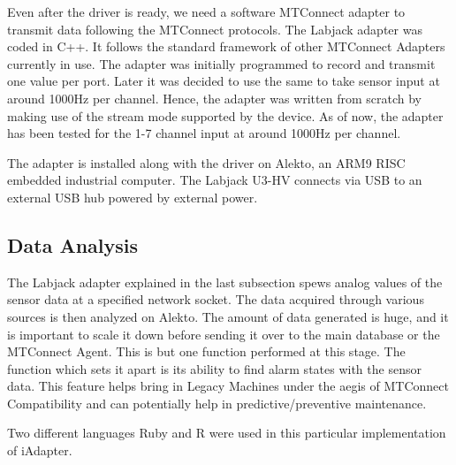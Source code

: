 \documentclass[preprint,authoryear,5p,times,twocolumn]{elsarticle}
\begin{document}
Even after the driver is ready, we need a software MTConnect adapter to transmit data following the MTConnect protocols. The Labjack adapter was coded in C++. It follows the standard framework of other MTConnect Adapters currently in use.  The adapter was initially programmed to record and transmit one value per port. Later it was decided to use the same to take sensor input at around 1000Hz per channel. Hence, the adapter was written from scratch by making use of the stream mode supported by the device. As of now, the adapter has been tested for the 1-7 channel input at around 1000Hz per channel.

The adapter is installed along with the driver on Alekto, an ARM9 RISC embedded industrial computer. The Labjack U3-HV connects via USB to an external USB hub powered by external power.

\subsection{Data Analysis}
The Labjack adapter explained in the last subsection spews analog values of the sensor data at a specified network socket. The data acquired through various sources is then analyzed on Alekto. The amount of data generated is huge, and it is important to scale it down before sending it over to the main database or the MTConnect Agent. This is but one function performed at this stage. The function which sets it apart is its ability to find alarm states with the sensor data. This feature helps bring in Legacy Machines under the aegis of MTConnect Compatibility and can potentially help in predictive/preventive maintenance.

Two different languages Ruby and R were used in this particular implementation of iAdapter.
\end{document}

